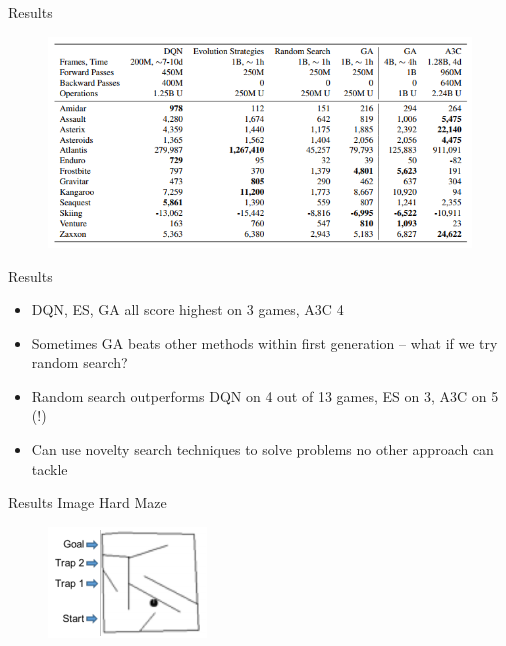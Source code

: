 \documentclass{beamer}
\begin{document}
	\begin{frame}{Results}
		\begin{figure}
			\centering
			\includegraphics[width=1.2\textheight]{deep_ga_results.png}
			\label{fig4}
		\end{figure}
	\end{frame}
	
	\begin{frame}{Results}
		\begin{itemize}
			\item DQN, ES, GA all score highest on 3 games, A3C 4
			\item Sometimes GA beats other methods within first generation -- what if we try random search?
			\item Random search outperforms DQN on 4 out of 13 games, ES on 3, A3C on 5 (!)
			\item Can use novelty search techniques to solve problems no other approach can tackle
		\end{itemize}
	\end{frame}
	
	\begin{frame}{Results}
		Image Hard Maze
		\begin{figure}
			\centering
			\includegraphics[width=.5\textheight]{image_hard_maze.png}
			\label{fig4}
		\end{figure}
	\end{frame}
	
\end{document}
